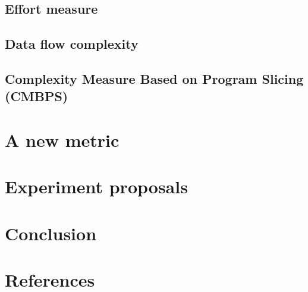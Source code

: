 \documentclass[]{article}
\begin{document}
\cite{ref:cilibrasi2005clustering}

\subsection{Effort measure}

\cite{ref:evaluating_software_complexity_measures}

\subsection{Data flow complexity}

\cite{ref:oviedo1993control}

\subsection{Complexity Measure Based on Program Slicing (CMBPS)}

\cite{ref:tao2014complexity}

\section{A new metric}




\section{Experiment proposals}



\section{Conclusion}
\section{References}

\printbibliography
\end{document}
